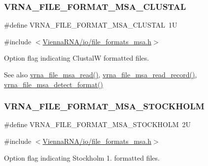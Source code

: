 \subsubsection{\texorpdfstring{VRNA\_FILE\_FORMAT\_MSA\_CLUSTAL}{VRNA\_FILE\_FORMAT\_MSA\_CLUSTAL}}
{\footnotesize\ttfamily \#define V\+R\+N\+A\+\_\+\+F\+I\+L\+E\+\_\+\+F\+O\+R\+M\+A\+T\+\_\+\+M\+S\+A\+\_\+\+C\+L\+U\+S\+T\+AL~1U}



{\ttfamily \#include $<$\mbox{\hyperlink{io_2file__formats__msa_8h}{Vienna\+R\+N\+A/io/file\+\_\+formats\+\_\+msa.\+h}}$>$}



Option flag indicating ClustalW formatted files. 

\begin{DoxySeeAlso}{See also}
\mbox{\hyperlink{group__file__formats__msa_gad02d5d12bda54611c915a1019323b7be}{vrna\+\_\+file\+\_\+msa\+\_\+read()}}, \mbox{\hyperlink{group__file__formats__msa_gad4203a438622b2df7bc2f16578d54799}{vrna\+\_\+file\+\_\+msa\+\_\+read\+\_\+record()}}, \mbox{\hyperlink{group__file__formats__msa_gade4fa8136ebb2d0f7eb3f8b59a8658e3}{vrna\+\_\+file\+\_\+msa\+\_\+detect\+\_\+format()}} 
\end{DoxySeeAlso}
\mbox{\label{group__file__formats__msa_ga62be992445cd8ab2ad7a8fded944338b}} 
\subsubsection{\texorpdfstring{VRNA\_FILE\_FORMAT\_MSA\_STOCKHOLM}{VRNA\_FILE\_FORMAT\_MSA\_STOCKHOLM}}
{\footnotesize\ttfamily \#define V\+R\+N\+A\+\_\+\+F\+I\+L\+E\+\_\+\+F\+O\+R\+M\+A\+T\+\_\+\+M\+S\+A\+\_\+\+S\+T\+O\+C\+K\+H\+O\+LM~2U}



{\ttfamily \#include $<$\mbox{\hyperlink{io_2file__formats__msa_8h}{Vienna\+R\+N\+A/io/file\+\_\+formats\+\_\+msa.\+h}}$>$}



Option flag indicating Stockholm 1. formatted files. 

